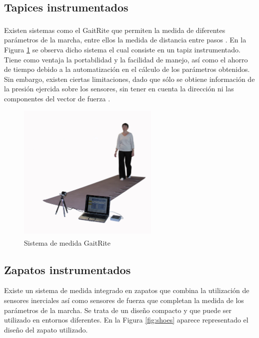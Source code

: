 	\subsection{Tapices instrumentados}
	
	Existen sistemas como el GaitRite\textsuperscript{\textregistered} que permiten la medida de diferentes parámetros de la marcha, entre ellos la medida de distancia entre pasos \cite{gaitrite}. En la Figura \ref{fig:gaitrite} se observa dicho sistema el cual consiste en un tapiz instrumentado. Tiene como ventaja la portabilidad y la facilidad de manejo, así como el ahorro de tiempo debido a la automatización en el cálculo de los parámetros obtenidos. Sin embargo, existen ciertas limitaciones, dado que sólo se
	obtiene información de la presión ejercida sobre los sensores, sin tener en cuenta la
	dirección ni las componentes del vector de fuerza \cite{begona}. 
	
	\begin{figure}[H]
		\centering
		\includegraphics[width=0.6\textwidth]{./graphics/GaitRite}
		\caption{Sistema de medida GaitRite\textsuperscript{\textregistered}} \label{fig:gaitrite}
	\end{figure}
	
	\subsection{Zapatos instrumentados}
	
	\cite{shoes} Existe un sistema de medida integrado en zapatos que combina la utilización de sensores inerciales así como sensores de fuerza que completan la medida de los parámetros de la marcha. Se trata de un diseño compacto y que puede ser utilizado en entornos diferentes. En la Figura \ref{fig:shoes} aparece representado el diseño del zapato utilizado.
	
